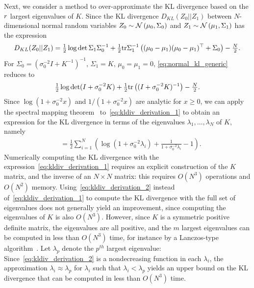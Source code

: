 \documentclass[onefignum,onetabnum]{siamart171218}
\begin{document}
Next, we consider a method to over-approximate the KL divergence based on the
$r$ largest eigenvalues of $K$. Since the 
KL divergence $D_{KL}(Z_0||Z_1)$ between $N$-dimensional normal random variables
$Z_0\sim\mathcal{N}\left(\mu_0,\Sigma_0\right)$ and
$Z_1\sim\mathcal{N}\left(\mu_1,\Sigma_1\right)$
has the expression
\begin{equation}
    \label{eq:normal_kl_generic} 
    D_{KL}(Z_0||Z_1)
    =
    \tfrac{1}{2}\log\det 
    \Sigma_1\Sigma_0^{-1}
    +
    \tfrac{1}{2}\text{tr}
    \Sigma_1^{-1}\left(
        (\mu_0-\mu_1)(\mu_0-\mu_1)^\top + \Sigma_0
    \right)-\tfrac{N}{2}.
\end{equation}
For $\Sigma_0=(\sigma_0^{-2}I + K^{-1})^{-1}$, $\Sigma_1=K$,
$\mu_0=\mu_1=0$, \eqref{eq:normal_kl_generic} reduces to
\begin{align}
        \tfrac{1}{2}\log\det(I+\sigma_0^{-2} K)
        +
        \tfrac{1}{2}\text{tr}\left((I+\sigma_0^{-2}K)^{-1}\right)
        -\tfrac{N}{2}.
        \label{eq:kldiv_derivation_1}
\end{align} 
Since $\log(1+\sigma_0^{-2}x)$ and $1/(1+\sigma_0^{-2}x)$ are analytic for $x
\ge 0$, we can apply the spectral mapping theorem~\cite[Sec. 4.7]{callier2012linear}
to~\eqref{eq:kldiv_derivation_1} to obtain an expression for the KL divergence
in terms of the 
eigenvalues $\lambda_1,\dotsc,\lambda_N$ of $K$, namely
\begin{align}
        \quad=
        \frac{1}{2}
        \sum_{i=1}^N
        \left(
        \log(1+\sigma_0^{-2}\lambda_i) +
    \frac{1}{1+\sigma_0^{-2}\lambda_i}-1\right).
        \label{eq:kldiv_derivation_2}
\end{align}
Numerically computing the KL divergence with the
expression~\ref{eq:kldiv_derivation_1} requires an explicit construction of the
$K$ matrix, and the inverse of an $N\times N$ matrix: this requires $O(N^3)$
operations and $O(N^2)$ memory.
Using~\eqref{eq:kldiv_derivation_2} instead of~\eqref{eq:kldiv_derivation_1} to
compute the KL divergence with the full set of eigenvalues does not generally
yield an improvement, since computing the eigenvalues of $K$ is also $O(N^3)$.
However, since $K$ is a symmetric positive definite matrix, the eigenvalues are
all positive, and the $m$ largest eigenvalues can be computed in less than
$O(N^3)$ time, for instance by a Lanczos-type algorithm~\cite[ch. 9]{van1996matrix}.
Let $\lambda_p$ denote the $p^{th}$ largest eigenvalue:
Since~\eqref{eq:kldiv_derivation_2} is a nondecreasing function in each 
$\lambda_i$, the approximation $\lambda_i \approx \lambda_p$ for $\lambda_i$ such that $\lambda_i < \lambda_p$ yields an
upper bound on the KL divergence that can be computed in less than $O(N^3)$
time. 
\end{document}
